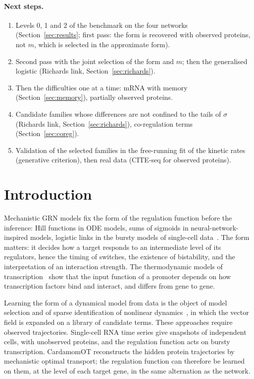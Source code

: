 \documentclass[a4paper, 11pt]{article}
\theoremstyle{plain}
\theoremstyle{remark}
\begin{document}
\paragraph{Next steps.}
\begin{enumerate}[nosep]
\item Levels 0, 1 and 2 of the benchmark on the four networks (Section~\ref{sec:results}; first pass: the form is recovered with observed proteins, not $m$, which is selected in the approximate form).
\item Second pass with the joint selection of the form and $m$; then the generalised logistic (Richards link, Section~\ref{sec:richards}).
\item Then the difficulties one at a time: mRNA with memory (Section~\ref{sec:memory}), partially observed proteins.
\item Candidate families whose differences are not confined to the tails of $\sigma$ (Richards link, Section~\ref{sec:richards}), co-regulation terms (Section~\ref{sec:coreg}).
\item Validation of the selected families in the free-running fit of the kinetic rates (generative criterion), then real data (CITE-seq for observed proteins).
\end{enumerate}

\section{Introduction}\label{sec:intro}

Mechanistic GRN models fix the form of the regulation function before the inference: Hill functions in ODE models, sums of sigmoids in neural-network-inspired models, logistic links in the bursty models of single-cell data~\cite{herbachinferring2017, mauge2026cardamomot}. The form matters: it decides how a target responds to an intermediate level of its regulators, hence the timing of switches, the existence of bistability, and the interpretation of an interaction strength. The thermodynamic models of transcription~\cite{shea1985lambda, bintu2005transcriptional} show that the input function of a promoter depends on how transcription factors bind and interact, and differs from gene to gene.

Learning the form of a dynamical model from data is the object of model selection and of sparse identification of nonlinear dynamics~\cite{brunton2016sindy, mangan2016inferring}, in which the vector field is expanded on a library of candidate terms. These approaches require observed trajectories. Single-cell RNA time series give snapshots of independent cells, with unobserved proteins, and the regulation function acts on bursty transcription. CardamomOT reconstructs the hidden protein trajectories by mechanistic optimal transport; the regulation function can therefore be learned on them, at the level of each target gene, in the same alternation as the network.
\end{document}
